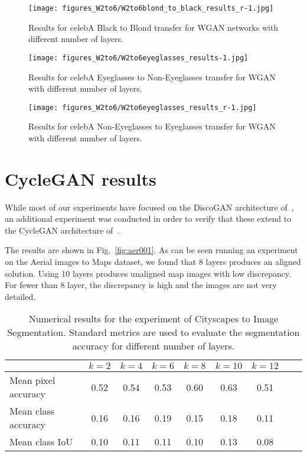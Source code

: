 \documentclass{article} %
\begin{document}
\begin{figure}[t]
  \centering
  
 \texttt{[image: figures\_W2to6/W2to6blond\_to\_black\_results\_r-1.jpg]}
  \caption{\label{fig:sw004} Results for celebA Black to Blond transfer for WGAN networks with different number of layers. }
\end{figure}

\begin{figure}[t]
  \centering
  
 \texttt{[image: figures\_W2to6/W2to6eyeglasses\_results-1.jpg]}
  \caption{\label{fig:sw005} Results for celebA Eyeglasses to Non-Eyeglasses transfer for WGAN with different number of layers. }
\end{figure}

\begin{figure}[t]
  \centering
  
 \texttt{[image: figures\_W2to6/W2to6eyeglasses\_results\_r-1.jpg]}
  \caption{\label{fig:sw006} Results for celebA Non-Eyeglasses to Eyeglasses transfer for WGAN with different number of layers. }
\end{figure}

\section{CycleGAN results}
\label{appendix:cyclegan}

While most of our experiments have focused on the DiscoGAN architecture of~\cite{discogan}, an additional experiment was conducted in order to verify that these extend to the CycleGAN architecture of~\cite{CycleGAN2017}.

The results are shown in Fig.~\ref{fig:aer001}. As can be seen running an experiment on the Aerial images to Maps dataset, we found that 8 layers produces an aligned solution. Using 10 layers produces unaligned map images with low discrepancy. For fewer than 8 layer, the discrepancy is high and the images are not very detailed. 

\begin{table}[H]
\centering
\caption{{\color{black} Numerical results for the experiment of Cityscapes to Image Segmentation. Standard metrics are used to evaluate the segmentation accuracy for different number of layers.}}
\label{tab:acc}
\begin{tabular}{lcccccccc}
                             & $k=2$     & $k=4$     & $k=6$     & $k=8$     & $k=10$     & $k=12$     \\
\midrule
Mean pixel accuracy & 0.52 & 0.54  & 0.53 & 0.60 & 0.63 & 0.51 \\
\midrule
Mean class accuracy & 0.16 & 0.16 & 0.19 & 0.15 & 0.18 & 0.11 \\
\midrule
Mean class IoU & 0.10 & 0.11 & 0.11 & 0.10 & 0.13 & 0.08 \\
\bottomrule      
\end{tabular}
\end{table}
\end{document}
